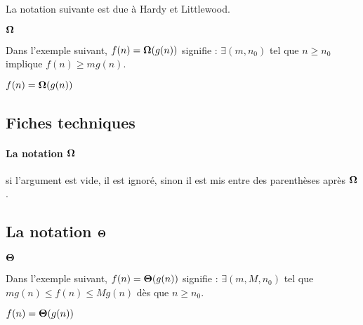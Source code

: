 \documentclass[12pt,a4paper]{article}
\begin{document}
La notation suivante est due à Hardy et Littlewood.

\begin{latexex}
$\bigomega{}$
\end{latexex}




\newparaexample{}

Dans l'exemple suivant, $f(n) = \bigomega{g(n)}$ signifie :
$\exists (m, n_0)$ tel que $n \geq n_0$ implique $f(n) \geq m g(n)$.

\begin{latexex}
$f(n) = \bigomega{g(n)}$
\end{latexex}




\subsection{Fiches techniques}

\paragraph{\texorpdfstring{La notation $\bigomega{}$}%
                          {La notation "grand Omega"}}


\IDarg{} si l'argument est vide, il est ignoré, sinon il est mis entre des parenthèses après $\bigomega{}$.




\subsection{\texorpdfstring{La notation $\bigtheta{}$}%
                              {La notation "grand Theta"}}

\newparaexample{}

\begin{latexex}
$\bigtheta{}$
\end{latexex}




\newparaexample{}

Dans l'exemple suivant, $f(n) = \bigtheta{g(n)}$ signifie : $\exists (m, M, n_0)$ tel que $m g(n) \leq f(n) \leq M g(n)$ dès que $n \geq n_0$.

\begin{latexex}
$f(n) = \bigtheta{g(n)}$
\end{latexex}
\end{document}
